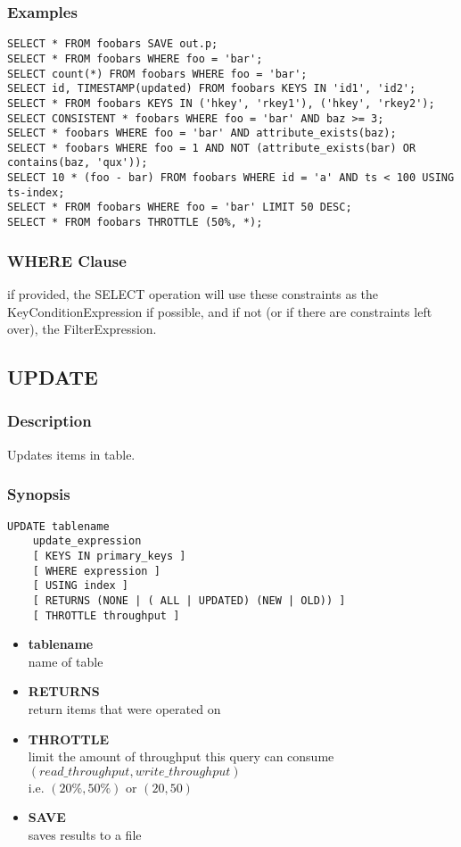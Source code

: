 \subsubsection{Examples}
\lstset{language=Java}
\begin{lstlisting}
SELECT * FROM foobars SAVE out.p;
SELECT * FROM foobars WHERE foo = 'bar';
SELECT count(*) FROM foobars WHERE foo = 'bar';
SELECT id, TIMESTAMP(updated) FROM foobars KEYS IN 'id1', 'id2';
SELECT * FROM foobars KEYS IN ('hkey', 'rkey1'), ('hkey', 'rkey2');
SELECT CONSISTENT * foobars WHERE foo = 'bar' AND baz >= 3;
SELECT * foobars WHERE foo = 'bar' AND attribute_exists(baz);
SELECT * foobars WHERE foo = 1 AND NOT (attribute_exists(bar) OR contains(baz, 'qux'));
SELECT 10 * (foo - bar) FROM foobars WHERE id = 'a' AND ts < 100 USING ts-index;
SELECT * FROM foobars WHERE foo = 'bar' LIMIT 50 DESC;
SELECT * FROM foobars THROTTLE (50%, *);	
\end{lstlisting}
\vspace{20pt}

\subsubsection{WHERE Clause}
if provided, the SELECT operation will use these constraints as the KeyConditionExpression if possible, and if not (or if there are constraints left over), the FilterExpression. 
\vspace{40pt}

\subsection{UPDATE}
\subsubsection{Description}
Updates items in table.

\subsubsection{Synopsis}
\lstset{language=Java}
\begin{lstlisting}
UPDATE tablename
    update_expression
    [ KEYS IN primary_keys ]
    [ WHERE expression ]
    [ USING index ]
    [ RETURNS (NONE | ( ALL | UPDATED) (NEW | OLD)) ]
    [ THROTTLE throughput ]	
\end{lstlisting}

\begin{itemize}
	\item \textbf{tablename} \\
	name of table
	\item \textbf{RETURNS} \\
	return items that were operated on
	\item \textbf{THROTTLE} \\
	limit the amount of throughput this query can consume\\
	$(read\_throughput, write\_throughput)$\\
	i.e. $(20\%, 50\%)$ or $(20, 50)$
	\item \textbf{SAVE} \\
	saves results to a file
\end{itemize}
